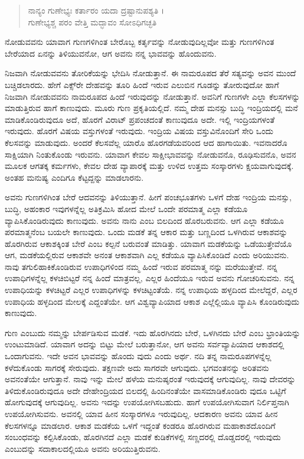 \begin{verse}
ನಾನ್ಯಂ ಗುಣೇಭ್ಯಃ ಕರ್ತಾರಂ ಯದಾ ದ್ರಷ್ಟಾನುಪಶ್ಯತಿ ।\\ಗುಣೇಭ್ಯಶ್ಚ ಪರಂ ವೇತ್ತಿ ಮದ್ಭಾವಂ ಸೋಽಧಿಗಚ್ಛತಿ 
\end{verse}

{\small ನೋಡುವವನು ಯಾವಾಗ ಗುಣಗಳಿಗಿಂತ ಬೇರೊಬ್ಬ ಕರ್ತೃವನ್ನು ನೋಡುವುದಿಲ್ಲವೋ ಮತ್ತು ಗುಣಗಳಿಗಿಂತ ಬೇರೆಯಾದ ಏನನ್ನು ತಿಳಿಯುವನೋ, ಆಗ ಅವನು ನನ್ನ ಭಾವವನ್ನು ಹೊಂದುವನು.}

ನಿಜವಾಗಿ ನೋಡುವವನು ತೋರಿಕೆಯನ್ನು ಭೇದಿಸಿ ನೋಡುತ್ತಾನೆ. ಈ ನಾಮರೂಪದ ತೆರೆ ಸತ್ಯವನ್ನು ಅವನ ಮುಂದೆ ಬಚ್ಚಿಡಲಾರದು. ಹೇಗೆ ಎಕ್ಸ್​ರೇ ದೇಹವನ್ನು ತೂರಿ ಹಿಂದೆ ಇರುವ ಎಲುಬಿನ ಗೂಡನ್ನು ತೋರುವುದೋ ಹಾಗೆ ನಿಜವಾಗಿ ನೋಡುವವನು ನಾಮರೂಪದ ಹಿಂದೆ ಇರುವುದನ್ನು ನೋಡುತ್ತಾನೆ. ಅವನಿಗೆ ಗುಣಗಳೇ ಎಲ್ಲಾ ಕೆಲಸಗಳನ್ನು ಮಾಡುತ್ತಿರುವ ಹಾಗೆ ಕಾಣುವುದು. ಮೂರು ಗುಣ ಪ್ರಕೃತಿಯಲ್ಲಿದೆ. ನಮ್ಮ ದೇಹ ಮನಸ್ಸು ಬುದ್ಧಿ ಇಂದ್ರಿಯದಲ್ಲಿ ಮನೆ ಮಾಡಿಕೊಂಡಿರುವುದೂ ಅದೆ, ಹೊರಗೆ ವಿರಾಟ್ ಪ್ರಪಂಚದಂತೆ ಕಾಣುವುದೂ ಅದೇ. ಇಲ್ಲಿ ಇಂದ್ರಿಯಗಳಂತೆ ಇರುವುದು. ಹೊರಗೆ ವಿಷಯ ವಸ್ತುಗಳಂತೆ ಇರುವುದು. ಇಂದ್ರಿಯ ವಿಷಯ ವಸ್ತುವಿನೊಂದಿಗೆ ಸೇರಿ ಒಂದು ಕೆಲಸವನ್ನು ಮಾಡುವುದು. ಅಂದರೆ ಕೆಲಸವೆಲ್ಲ ಯಾರೊ ಹೊರಗಡೆಯವರಿಂದ ಆದ ಹಾಗಾಯಿತು. ಇವನಾದರೊ ಸಾಕ್ಷಿಯಾಗಿ ನಿಂತುಕೊಂಡು ಇರುವನು. ಯಾವಾಗ ಕೇವಲ ಸಾಕ್ಷೀಭಾವವನ್ನು ನೋಡುವನೊ, ರೂಢಿಸುವನೊ, ಅವನ ಮೂಲಕ ಆಗತಕ್ಕ ಕರ್ಮಗಳು, ಕೇವಲ ದೇಹ ವ್ಯಾಪಾರಕ್ಕೆ ಮತ್ತು ಉಳಿದ ಉತ್ತಮ ಸಂಸ್ಕಾರಗಳು ಕ್ಷಯವಾಗುವುದಕ್ಕೆ. ಅಂತಹ ಮನುಷ್ಯ ಎಂದಿಗೂ ಕೆಟ್ಟದ್ದನ್ನು ಮಾಡಲಾರನು.

ಅವನು ಗುಣಗಳಿಗಿಂತ ಬೇರೆ ಆದವನನ್ನು ತಿಳಿಯುತ್ತಾನೆ. ಹೀಗೆ ಪಂಚಭೂತಗಳು ಒಳಗೆ ದೇಹ ಇಂದ್ರಿಯ ಮನಸ್ಸು, ಬುದ್ಧಿ, ಅಹಂಕಾರ ಇವುಗಳನ್ನೆಲ್ಲ ಅತಿಕ್ರಮಿಸಿ ಹೋದ ಮೇಲೆ ಒಂದೇ ಪರಮಾತ್ಮ ಎಲ್ಲಾ ಕಡೆಯೂ ವ್ಯಾಪಿಸಿಕೊಂಡಿರುವುದು ಕಾಣುವುದು. ಅವನು ನಾನು ಎಂಬ ಬಿಲದಿಂದ ಹೊರಬರುವನು. ಆಗ ಎಲ್ಲಾ ಕಡೆಯೂ ಪರಮಾತ್ಮನೆಂಬ ಬಯಲೇ ಕಾಣುವುದು. ಒಂದು ಮಡಕೆ ತನ್ನ ಆಕಾರ ಮತ್ತು ಬಣ್ಣದಿಂದ ಒಳಗಿರುವ ಆಕಾಶವನ್ನು ಹೊರಗಿರುವ ಆಕಾಶಕ್ಕಿಂತ ಬೇರೆ ಎಂಬ ಕಲ್ಪನೆ ಬರುವಂತೆ ಮಾಡಿತ್ತು. ಯಾವಾಗ ಮಡಕೆಯನ್ನು ಒಡೆಯುತ್ತೇವೆಯೊ ಆಗ, ಮಡಕೆಯಲ್ಲಿರುವ ಆಕಾಶವೇ ಅನಂತ ಆಕಾಶವಾಗಿ ಎಲ್ಲ ಕಡೆಯೂ ವ್ಯಾಪಿಸಿಕೊಂಡಿದೆ ಎಂದು ಅರಿಯುವನು. ನಾವು ತಗುಲಿಹಾಕಿಕೊಂಡಿರುವ ಉಪಾಧಿಗಳಿಂದ ನಮ್ಮ ಹಿಂದೆ ಇರುವ ಪರಮಾತ್ಮ ನನ್ನು ಮರೆಯುತ್ತೇವೆ. ನನ್ನ ಉಪಾಧಿಗಳನ್ನೆಲ್ಲ ಕಳಚಿಬಿಟ್ಟರೆ ನನ್ನ ಹಿಂದೆ ಮಾತ್ರವಲ್ಲ, ಎಲ್ಲರ ಹಿಂದೆಯೂ ಇರುವ ಅವನು ಗೋಚರಿಸುವನು. ನನ್ನ ಉಪಾಧಿಯನ್ನು ಕಳಚಿಟ್ಟರೆ ಎಲ್ಲರ ಉಪಾಧಿಗಳನ್ನು ಕಳಚಿಟ್ಟಂತೆಯೆ. ನನ್ನ ಉಪಾಧಿಯ ಹಳ್ಳದಿಂದ ಮೇಲೆದ್ದರೆ, ಎಲ್ಲರ ಉಪಾಧಿಯ ಹಳ್ಳದಿಂದ ಮೇಲಕ್ಕೆ ಎದ್ದಂತೆಯೇ. ಆಗ ವಿಶ್ವವ್ಯಾಪಿಯಾದ ಆಕಾಶ ಎಲ್ಲೆಲ್ಲಿಯೂ ವ್ಯಾಪಿಸಿ ಕೊಂಡಿರುವುದು ಕಾಣುವುದು.

ಗುಣ ಎಂಬುದು ನಮ್ಮನ್ನು ಬೇರ್ಪಡಿಸುವ ಮಡಕೆ. ಇದು ಹೊರಗಿನದು ಬೇರೆ, ಒಳಗಿನದು ಬೇರೆ ಎಂಬ ಭ್ರಾಂತಿಯನ್ನು ಉಂಟುಮಾಡಿದೆ. ಯಾವಾಗ ಅದನ್ನು ಬಿಟ್ಟು ಮೇಲೆ ಬರುತ್ತಾನೋ, ಆಗ ಅವನು ಸರ್ವವ್ಯಾಪಿಯಾದ ಆಕಾಶದಲ್ಲಿ ಒಂದಾಗುವನು. ಇದೇ ಅವನ ಭಾವವನ್ನು ಹೊಂದು ವುದು ಎಂದು ಅರ್ಥ. ನದಿ ತನ್ನ ನಾಮರೂಪಗಳನ್ನೆಲ್ಲ ಕಳೆದುಕೊಂಡು ಸಾಗರಕ್ಕೆ ಸೇರುವುದು. ತಕ್ಷಣವೇ ಅದು ಸಾಗರವೇ ಆಗುವುದು. ಭಗವಂತನನ್ನು ಅರಿತವನು ಅವನಂತೆಯೇ ಆಗುತ್ತಾನೆ. ನಾವು ಇನ್ನು ಮೇಲೆ ಹಳೆಯ ಮನುಷೃರಂತೆ ಇರುವುದಕ್ಕೆ ಆಗುವುದಿಲ್ಲ. ನಾವು ದೇವರನ್ನು ತಿಳಿದುಕೊಂಡಿರುವುದೂ ಅದೇ ದೇಹೇಂದ್ರಿಯದ ಬಿಲದಲ್ಲಿ ಹಿಂದಿನಂತೆಯೇ ವಾಸಮಾಡಿಕೊಂಡಿರು ವುದೂ ಒಟ್ಟಿಗೆ ಹೋಗುವುದಕ್ಕೆ ಆಗುವುದಿಲ್ಲ. ಅವನು ಇದನ್ನು ಉಪಯೋಗಿಸಬಹುದು. ಹಾಗೆ ಉಪಯೋಗಿಸುವಾಗ ನಿರ್ಲಿಪ್ತನಾಗಿ ಉಪಯೋಗಿಸುವನು. ಅವನಲ್ಲಿ ಯಾವ ಹೀನ ಸಂಸ್ಕಾರಗಳೂ ಇರುವುದಿಲ್ಲ. ಆದಕಾರಣ ಅವನು ಯಾವ ಹೀನ ಕೆಲಸಗಳನ್ನೂ ಮಾಡಲಾರ. ಆಕಾಶ ಮಡಕೆಯ ಒಳಗೆ ಇದ್ದಂತೆ ಕಂಡರೂ ಹೊರಗಿರುವ ಮಹಾಕಾಶದೊಂದಿಗೆ ಸಂಬಂಧವನ್ನು ಕಲ್ಪಿಸಿಕೊಂಡು, ಹೊರಗಿನದೆ ಎಲ್ಲಾ ಮಡಕೆ ಕುಡಿಕೆಗಳಲ್ಲಿ ಸಣ್ಣದರಲ್ಲಿ ದೊಡ್ಡದರಲ್ಲಿ ಇರುವುದು ಎಂಬುದನ್ನು ಸದಾಕಾಲದಲ್ಲಿಯೂ ಅವನು ಅರಿಯುತ್ತಿರುವನು.

